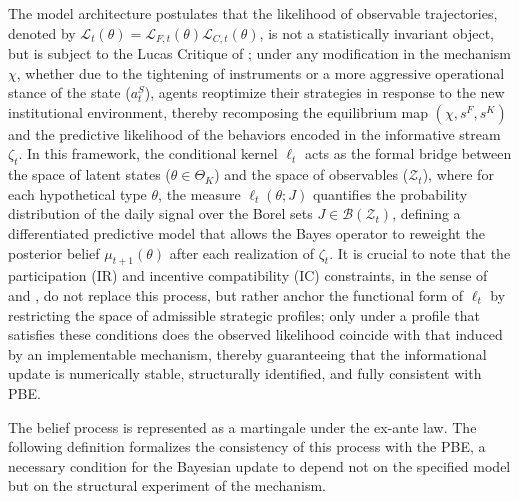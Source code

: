 \documentclass[ecta,nameyear,draft]{econsocart}
\theoremstyle{plain}
\theoremstyle{definition}
\newcommand{\ThetaK}{\Theta_K}
\newcommand{\1}{\mathbf{1}}
\begin{document}
The model architecture postulates that the likelihood of observable trajectories, denoted by $\mathcal{L}_t(\theta)=\mathcal{L}_{F,t}(\theta)\mathcal{L}_{C,t}(\theta)$, is not a statistically invariant object, but is subject to the Lucas Critique of \citet{Lucas1976}; under any modification in the mechanism $\chi$, whether due to the tightening of instruments or a more aggressive operational stance of the state ($a_t^S$), agents reoptimize their strategies in response to the new institutional environment, thereby recomposing the equilibrium map $(\chi, s^F, s^K)$ and the predictive likelihood of the behaviors encoded in the informative stream $\zeta_t$. In this framework, the conditional kernel $\ell_t$ acts as the formal bridge between the space of latent states ($\theta \in \ThetaK$) and the space of observables ($\mathcal{Z}_t$), where for each hypothetical type $\theta$, the measure $\ell_t(\theta; J)$ quantifies the probability distribution of the daily signal over the Borel sets $J \in \mathcal{B}(\mathcal{Z}_t)$, defining a differentiated predictive model that allows the Bayes operator to reweight the posterior belief $\mu_{t+1}(\theta)$ after each realization of $\zeta_t$. It is crucial to note that the participation (IR) and incentive compatibility (IC) constraints, in the sense of \citet{Myerson1979IC} and \citet{BoltonDewatripont2005}, do not replace this process, but rather anchor the functional form of $\ell_t$ by restricting the space of admissible strategic profiles; only under a profile that satisfies these conditions does the observed likelihood coincide with that induced by an implementable mechanism, thereby guaranteeing that the informational update is numerically stable, structurally identified, and fully consistent with PBE.

The belief process is represented as a martingale under the ex-ante law. The following definition formalizes the consistency of this process with the PBE, a necessary condition for the Bayesian update to depend not on the specified model but on the structural experiment of the mechanism.
\end{document}
